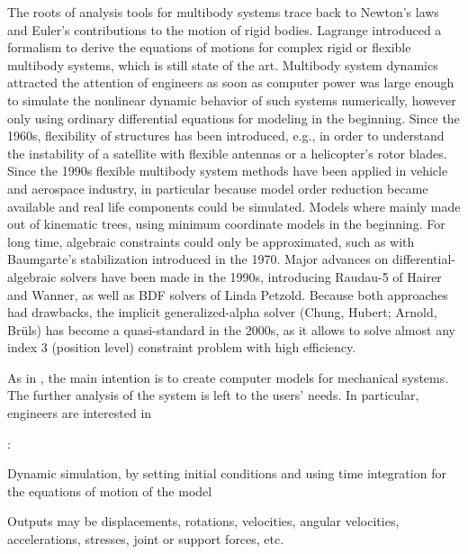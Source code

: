 The roots of analysis tools for multibody systems trace back to Newton's laws and Euler's contributions to the motion of rigid bodies. 
Lagrange introduced a formalism to derive the equations of motions for complex rigid or flexible multibody systems, which is still state of the art. 
Multibody system dynamics attracted the attention of engineers as soon as computer power was large enough to simulate the nonlinear dynamic behavior of such systems numerically, however only using ordinary differential equations for modeling in the beginning.
Since the 1960s, flexibility of structures has been introduced, e.g., in order to understand the instability of a satellite with flexible antennas or a helicopter's rotor blades.
Since the 1990s flexible multibody system methods have been applied in vehicle and aerospace industry, in particular because model order reduction became available and real life components could be simulated.
Models where mainly made out of kinematic trees, using minimum coordinate models in the beginning. For long time, algebraic constraints could only be approximated, such as with Baumgarte's stabilization introduced in the 1970.
Major advances on differential-algebraic solvers have been made in the 1990s, introducing Raudau-5 of Hairer and Wanner, as well as BDF solvers of Linda Petzold. Because both approaches had drawbacks, the implicit generalized-alpha solver (Chung, Hubert; Arnold, Br{\"u}ls)  has become a quasi-standard in the 2000s, as it allows to solve almost any index 3 (position level) constraint problem with high efficiency.

%
As in \codeName, the main intention is to create computer models for mechanical systems.
The further analysis of the system is left to the users' needs. In particular, engineers are interested in \vspace{0.5cm}

\noindent {}: 
\bi
  \item Dynamic simulation, by setting initial conditions and using time integration for the equations of motion of the model
  \item Outputs may be displacements, rotations, velocities, angular velocities, accelerations, stresses, joint or support forces, etc.
\ei

